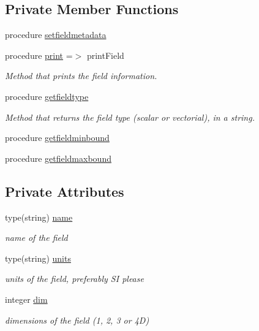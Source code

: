 \subsection*{Private Member Functions}
\begin{DoxyCompactItemize}
\item 
procedure \mbox{\hyperlink{structfieldtypes__mod_1_1field__class_a3dd056d55794122c3358d103e2c56f18}{setfieldmetadata}}
\item 
procedure \mbox{\hyperlink{structfieldtypes__mod_1_1field__class_afaab58efcda61608934254b6b4d85ed5}{print}} =$>$ print\+Field
\begin{DoxyCompactList}\small\item\em Method that prints the field information. \end{DoxyCompactList}\item 
procedure \mbox{\hyperlink{structfieldtypes__mod_1_1field__class_a8474f700cf545721b177e1fc91020fd7}{getfieldtype}}
\begin{DoxyCompactList}\small\item\em Method that returns the field type (scalar or vectorial), in a string. \end{DoxyCompactList}\item 
procedure \mbox{\hyperlink{structfieldtypes__mod_1_1field__class_ac649c9d1381497b945ccdb67b84ddd1a}{getfieldminbound}}
\item 
procedure \mbox{\hyperlink{structfieldtypes__mod_1_1field__class_a8275318f997672a2933ff6bbdcffa521}{getfieldmaxbound}}
\end{DoxyCompactItemize}
\subsection*{Private Attributes}
\begin{DoxyCompactItemize}
\item 
type(string) \mbox{\hyperlink{structfieldtypes__mod_1_1field__class_a0482789d206fc831b81c99daa17069d3}{name}}
\begin{DoxyCompactList}\small\item\em name of the field \end{DoxyCompactList}\item 
type(string) \mbox{\hyperlink{structfieldtypes__mod_1_1field__class_abd4cf1204fbe4f2d174dd81230511077}{units}}
\begin{DoxyCompactList}\small\item\em units of the field, preferably SI please \end{DoxyCompactList}\item 
integer \mbox{\hyperlink{structfieldtypes__mod_1_1field__class_a46ac561c9acc61595c7e15d30a56794e}{dim}}
\begin{DoxyCompactList}\small\item\em dimensions of the field (1, 2, 3 or 4D) \end{DoxyCompactList}\end{DoxyCompactItemize}


